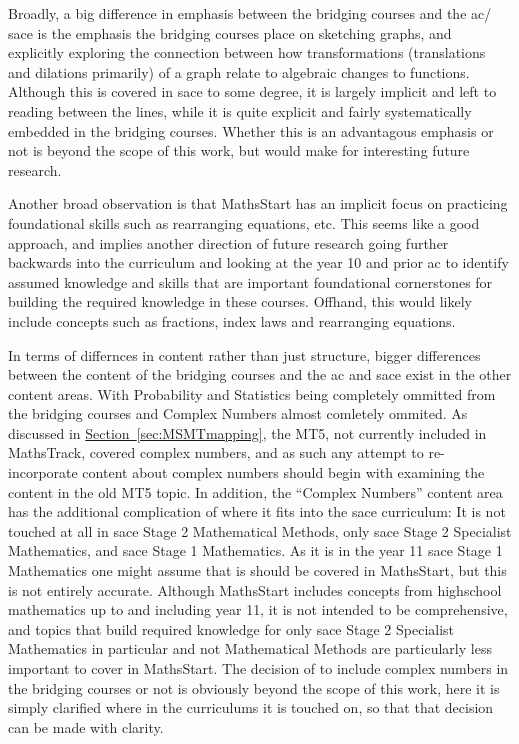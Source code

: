 \documentclass[twoside,12pt,a4paper]{report}
\newcommand{\refsec}[1]{\hyperref[sec:#1]{Section~\ref{sec:#1}}}
\begin{document}
Broadly, a big difference in emphasis between the bridging courses and the \gls{ac}/ \gls{sace} is the emphasis the bridging courses place on sketching graphs, and explicitly exploring the connection between how transformations (translations and dilations primarily) of a graph relate to algebraic changes to functions. Although this is covered in \gls{sace} to some degree, it is largely implicit and left to reading between the lines, while it is quite explicit and fairly systematically embedded in the bridging courses. Whether this is an advantagous emphasis or not is beyond the scope of this work, but would make for interesting future research.

Another broad observation is that MathsStart has an implicit focus on practicing foundational skills such as rearranging equations, etc. This seems like a good approach, and implies another direction of future research going further backwards into the curriculum and looking at the year 10 and prior \gls{ac} to identify assumed knowledge and skills that are important foundational cornerstones for building the required knowledge in these courses. Offhand, this would likely include concepts such as fractions, index laws and rearranging equations. 

In terms of differnces in content rather than just structure, bigger differences between the content of the bridging courses and the \gls{ac} and \gls{sace} exist in the other content areas. With Probability and Statistics being completely ommitted from the bridging courses and Complex Numbers almost comletely ommited. As discussed in \refsec{MSMTmapping}, the MT5, not currently included in MathsTrack, covered complex numbers, and as such any attempt to re-incorporate content about complex numbers should begin with examining the content in the old MT5 topic. In addition, the ``Complex Numbers'' content area has the additional complication of where it fits into the \gls{sace} curriculum: It is not touched at all in \gls{sace} Stage 2 Mathematical Methods, only \gls{sace} Stage 2 Specialist Mathematics, and \gls{sace} Stage 1 Mathematics. As it is in the year 11 \gls{sace} Stage 1 Mathematics one might assume that is should be covered in MathsStart, but this is not entirely accurate. Although MathsStart includes concepts from highschool mathematics up to and including year 11, it is not intended to be comprehensive, and topics that build required knowledge for only \gls{sace} Stage 2 Specialist Mathematics in particular and not Mathematical Methods are particularly less important to cover in MathsStart. The decision of to include complex numbers in the bridging courses or not is obviously beyond the scope of this work, here it is simply clarified where in the curriculums it is touched on, so that that decision can be made with clarity.
\end{document}
